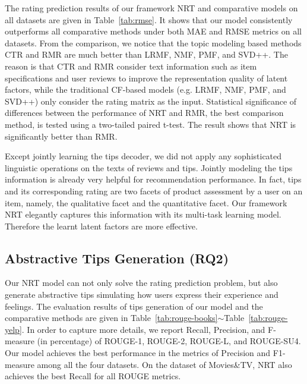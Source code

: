 \documentclass[sigconf]{acmart}
\begin{document}
The rating prediction results of our framework NRT and comparative models on all datasets are given in Table~\ref{tab:rmse}.
It shows that our model consistently outperforms all comparative methods under both MAE and RMSE
metrics on all datasets.
From the comparison,  we notice that the topic modeling based methods CTR and RMR are much better than LRMF, NMF, PMF, and SVD++.
The reason is that CTR and RMR consider text information such as item specifications and user reviews to improve the representation quality of latent factors,
while the traditional CF-based models (e.g. LRMF, NMF, PMF, and SVD++) only consider the rating matrix as the input.
Statistical significance of differences between the performance of NRT and RMR, the best comparison method, is tested using a two-tailed paired t-test. The result shows that NRT is significantly better than RMR.


Except jointly learning the tips decoder, we did not apply any sophisticated linguistic operations on the texts of reviews and tips. Jointly modeling the tips information is already very helpful for recommendation performance.
In fact, tips and its corresponding rating are two facets of
product assessment by a user on an item, namely, the qualitative facet and the quantitative facet.
Our framework NRT elegantly captures this information with its multi-task learning model. Therefore the learnt latent factors are more effective.


\subsection{Abstractive Tips Generation (RQ2)}
\label{sec:exp:tips}

Our NRT model can not only solve the rating prediction problem, but also generate abstractive tips simulating how users express their experience and feelings.
The evaluation results of tips generation of our model and the comparative methods are given in Table~\ref{tab:rouge-books}$\sim$Table~\ref{tab:rouge-yelp}.
In order to capture more details, we report Recall, Precision, and F-measure (in percentage) of ROUGE-1, ROUGE-2, ROUGE-L, and ROUGE-SU4.
Our model achieves the best performance in the metrics of Precision and F1-measure among all the four datasets.
On the dataset of Movies\&TV, NRT also achieves the best Recall for all ROUGE metrics.
\end{document}
